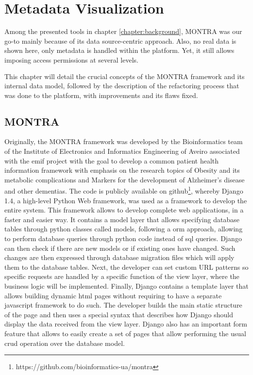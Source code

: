 \chapter{Metadata Visualization}
\label{chapter:metadata-visualization}
\graphicspath{{figs/03-visualization/}}

Among the presented tools in chapter \ref{chapter:background}, MONTRA was our go-to mainly because of its data source-centric approach.
Also, no real data is shown here, only metadata is handled within the platform.
Yet, it still allows imposing access permissions at several levels.

This chapter will detail the crucial concepts of the MONTRA framework and its internal data model, followed by the description of the refactoring process that was done to the platform, with improvements and its flaws fixed.

\section{MONTRA}

Originally, the MONTRA framework was developed by the Bioinformatics team of the Institute of Electronics and Informatics Engineering of Aveiro associated with the \gls{emif} project with the goal to develop a common patient health information framework with emphasis on the research topics of Obesity and its metabolic complications and Markers for the development of Alzheimer's disease and other dementias.
The code is publicly available on github\footnote{https://github.com/bioinformatics-ua/montra}, whereby Django 1.4, a high-level Python Web framework\cite{django}, was used as a framework to develop the entire system.
This framework allows to develop complete web applications, in a faster and easier way.
It contains a model layer that allows specifying database tables through python classes called models, following a \gls{orm} approach, allowing to perform database queries through python code instead of \gls{sql} queries.
Django can then check if there are new models or if existing ones have changed. Such changes are then expressed through database migration files which will apply them to the database tables.
Next, the developer can set custom URL patterns so specific requests are handled by a specific function of the view layer, where the business logic will be implemented.
Finally, Django contains a template layer that allows building dynamic \gls{html} pages without requiring to have a separate javascript framework to do such.
The developer builds the main static structure of the page and then uses a special syntax that describes how Django should display the data received from the view layer.
Django also has an important form feature that allows to easily create a set of pages that allow performing the usual \gls{crud} operation over the database model.

